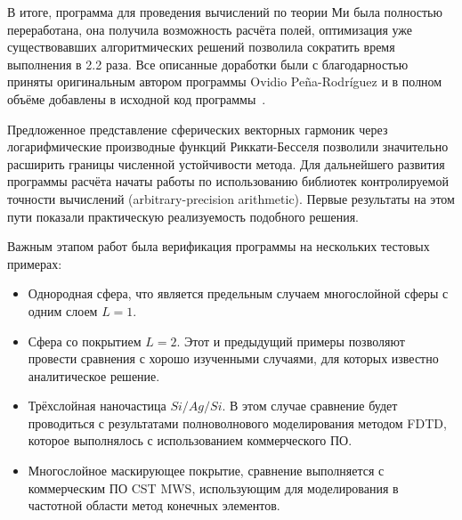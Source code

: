 В итоге, программа для проведения вычислений по теории Ми была полностью
переработана, она получила возможность расчёта полей, оптимизация уже
существовавших алгоритмических решений позволила сократить время
выполнения в 2.2 раза.  Все описанные доработки были с благодарностью
приняты оригинальным автором программы Ovidio Pe\~{n}a-Rodr\'{i}guez и
в полном объёме добавлены в исходной код
программы~\cite{Scattnlay-web}.

Предложенное представление сферических векторных гармоник через
логарифмические производные функций Риккати-Бесселя позволили
значительно расширить границы численной устойчивости метода.  Для
дальнейшего развития программы расчёта начаты работы по использованию
библиотек контролируемой точности вычислений (arbitrary-precision
arithmetic).  Первые результаты на этом пути показали практическую
реализуемость подобного решения.


Важным этапом работ была верификация программы на нескольких
тестовых примерах:
\begin{itemize}
\item Однородная сфера, что является предельным случаем многослойной
  сферы с одним слоем $L=1$.
\item Сфера со покрытием $L=2$. Этот и предыдущий примеры позволяют
  провести сравнения с хорошо изученными случаями, для которых
  известно аналитическое решение.
\item Трёхслойная наночастица $Si/Ag/Si$. В этом случае сравнение
  будет проводиться с результатами полноволнового моделирования
  методом FDTD, которое выполнялось с использованием коммерческого ПО.
\item Многослойное маскирующее покрытие, сравнение выполняется с
  коммерческим ПО CST MWS, использующим для моделирования в частотной
  области метод конечных элементов.
\end{itemize}


